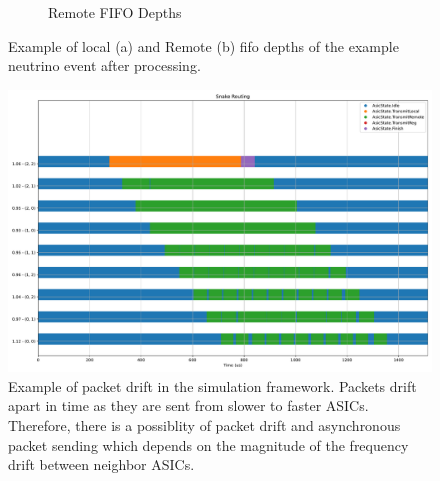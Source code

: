 \begin{figure}
\begin{subfigure}{.5\textwidth}
  \caption{Remote FIFO Depths}
\end{subfigure}
\caption{Example of local (a) and Remote (b) fifo depths of the example neutrino event after processing.}
\label{fig:snake_example_neutrino}
\end{figure}

\begin{figure}[]
\centering
\includegraphics[width=\textwidth]{images/snake_timer.pdf}
\caption{Example of packet drift in the simulation framework.
  Packets drift apart in time as they are sent from slower to faster ASICs.
  Therefore, there is a possiblity of packet drift and asynchronous packet sending which depends on the magnitude of the frequency drift between neighbor ASICs.}
\end{figure}~\label{fig:packet_drift}

